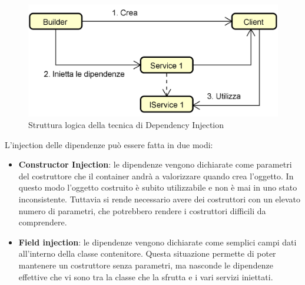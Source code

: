 \begin{itemize}
	\begin{figure}[ht]
	\centering
	\includegraphics[scale=0.25]{Sezioni/DesignPatterns/DependencyInjection.png}
	\caption{Struttura logica della tecnica di Dependency Injection}
	\end{figure}
	L'injection delle dipendenze può essere fatta in due modi:
	\begin{itemize}
	 	\item \textbf{Constructor Injection}: le dipendenze vengono dichiarate come parametri del costruttore
che il container andrà a valorizzare quando crea l’oggetto. In questo modo l’oggetto costruito è subito utilizzabile e non è mai in uno stato inconsistente. Tuttavia
si rende necessario avere dei costruttori con un elevato numero di parametri, che
potrebbero rendere i costruttori difficili da comprendere.
 	 	\item \textbf{Field injection}: le dipendenze vengono dichiarate come semplici campi dati all'interno della classe contenitore. Questa situazione permette di poter mantenere un costruttore senza parametri, ma nasconde le dipendenze effettive che vi sono tra la classe che la sfrutta e i vari servizi iniettati.
	\end{itemize}
	

\end{itemize}
